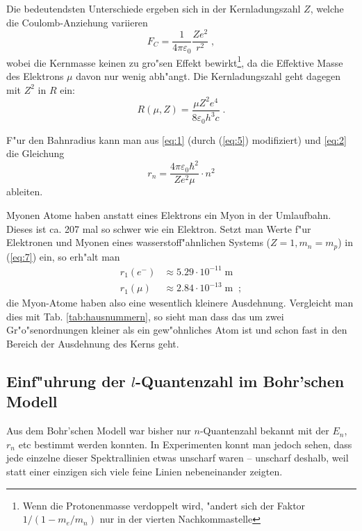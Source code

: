 \documentclass[a4paper,draft]{article}
\begin{document}
Die bedeutendsten Unterschiede ergeben sich in der Kernladungszahl
$Z$, welche die Coulomb-Anziehung variieren
\begin{equation}
  \label{eq:5}
  F_C = \frac{1}{4\pi\varepsilon_0} \frac{Z e^2}{r^2} \;,
\end{equation}
wobei die Kernmasse keinen zu gro"sen Effekt bewirkt\footnote{Wenn die
Protonenmasse verdoppelt wird, "andert sich der Faktor $1/(1-m_e/m_n)$
nur in der vierten Nachkommastelle}, da die Effektive
Masse des Elektrons $\mu$ davon nur wenig abh"angt. Die
Kernladungszahl geht dagegen mit $Z^2$ in $R$ ein:
\begin{equation}
  \label{eq:6}
  R(\mu,Z) = \frac{\mu Z^2 e^4}{8 \varepsilon_0 h^3 c} \;.
\end{equation}

F"ur den Bahnradius kann man aus \eqref{eq:1} (durch (\ref{eq:5})
modifiziert) und \eqref{eq:2} die Gleichung 
\begin{equation}
  \label{eq:7}
  r_n = \frac{4\pi\varepsilon_0\hbar^2}{Ze^2 \mu} \cdot n^2
\end{equation}
ableiten.


\begin{Anw}
Myonen Atome haben anstatt eines Elektrons ein Myon in der
Umlaufbahn. Dieses ist ca. 207 mal so schwer wie ein Elektron. Setzt
man Werte f"ur Elektronen und Myonen eines wasserstoff"ahnlichen
Systems ($Z=1, m_n = m_p$) in (\ref{eq:7}) ein, so erh"alt
man
\begin{align*}
r_1(e^-) & \approx 5.29 \cdot 10^{-11}\operatorname{m}\\
r_1(\mu) & \approx 2.84 \cdot 10^{-13}\operatorname{m} \;;
\end{align*}
die Myon-Atome haben also eine wesentlich kleinere
Ausdehnung. Vergleicht man dies mit Tab. \ref{tab:hausnummern}, so
sieht man dass das um zwei Gr"o"senordnungen kleiner als ein
gew"ohnliches Atom ist und schon fast in den Bereich der Ausdehnung
des Kerns geht.
\end{Anw}





\subsection{Einf"uhrung der $l$-Quantenzahl im Bohr'schen Modell}
\label{sec:einf_der_l_quant_ansch}


Aus dem Bohr'schen Modell war bisher nur $n$-Quantenzahl bekannt mit
der $E_n$, $r_n$ etc bestimmt werden konnten. In Experimenten konnt
man jedoch sehen, dass jede einzelne dieser Spektrallinien etwas
unscharf waren -- unscharf deshalb, weil statt einer einzigen sich
viele feine Linien nebeneinander zeigten.
\end{document}

